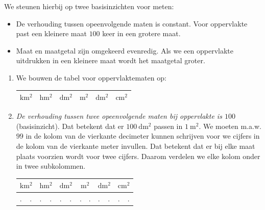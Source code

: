 \begin{multicols}{2}
    

We steunen hierbij op twee basisinzichten voor meten:
\begin{itemize}
\item De verhouding tussen opeenvolgende maten is constant. Voor oppervlakte past een kleinere maat \(100\) keer in een grotere maat.
\item Maat en maatgetal zijn omgekeerd evenredig.
Als we een oppervlakte uitdrukken in een kleinere maat wordt het maatgetal groter.
\end{itemize}

\begin{enumerate}
\item We bouwen de tabel voor oppervlaktematen op:
\begin{tabel}
    \begin{tabular}{|m{0.3cm}:m{0.3cm}|m{0.3cm}:m{0.3cm}|m{0.3cm}:m{0.3cm}|m{0.3cm}:m{0.3cm}|m{0.3cm}:m{0.3cm}|m{0.3cm}:m{0.3cm}|}
		\hline
         &  &  &  &  &  \\
        \hline
	\end{tabular}
\end{tabel}

\item \emph{De verhouding tussen twee opeenvolgende maten bij oppervlakte is \(100\)} (basisinzicht).
Dat betekent dat er \(\SI{100}{\deci\metre\squared}\) passen in \(\SI{1}{\metre\squared}\).
We moeten m.a.w. \(99\) in de kolom van de vierkante decimeter kunnen schrijven voor we cijfers in de kolom van de vierkante meter invullen.
Dat betekent dat er bij elke maat plaats voorzien wordt voor twee cijfers.
Daarom verdelen we elke kolom onder in twee subkolommen.

\begin{tabel}
	\begin{tabular}{|m{0.3cm}:m{0.3cm}|m{0.3cm}:m{0.3cm}|m{0.3cm}:m{0.3cm}|m{0.3cm}:m{0.3cm}|m{0.3cm}:m{0.3cm}|m{0.3cm}:m{0.3cm}|}
		\hline
         &  &  &  &  &  \\
        \hline
        .&.&.&.&.&.&.&.&.&.&.&.\\
        \hline
	\end{tabular}
\end{tabel}


\end{enumerate}
\end{multicols}
